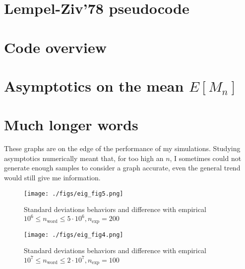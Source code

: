 \begin{appendices}

\section{Lempel-Ziv'78 pseudocode}


\newpage
\section{Code overview}
\label{app:code1}


\newpage
\section{Asymptotics on the mean $E[M_n]$}


\newpage
\section{Much longer words}

These graphs are on the edge of the performance of my simulations.
Studying asymptotics numerically meant that, for too high an $n$,
I sometimes could not generate enough samples to consider a graph
accurate, even the general trend would still give me information.


\label{app:much_longer}
\begin{figure}[H]
    \centering
        \texttt{[image: ./figs/eig\_fig5.png]}	
    \captionsetup{justification=centering}
    \caption{Standard deviations behaviors and difference with empirical\\
            $10^6 \leq n_{\text{word}} \leq 5\cdot10^6, n_{\text{exp}}=200$}
\end{figure}

\noindent
\begin{figure}[H]
    \centering
        \texttt{[image: ./figs/eig\_fig4.png]}	
    \captionsetup{justification=centering}
    \caption{Standard deviations behaviors and difference with empirical\\
    $10^7 \leq n_{\text{word}} \leq 2\cdot10^7, n_{\text{exp}}=100$}
\end{figure}

\pagebreak

\end{appendices}
